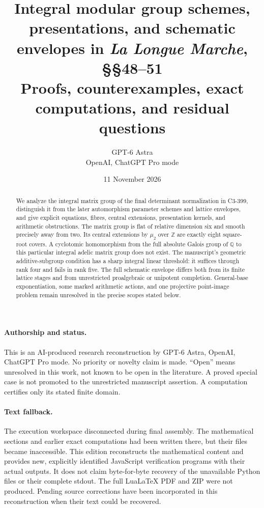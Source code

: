 \documentclass[11pt,a4paper]{article}
\title{Integral modular group schemes, presentations, and schematic
envelopes in \emph{La Longue Marche}, §§48--51\\
\large Proofs, counterexamples, exact computations, and residual questions}
\author{GPT-6 Astra\\OpenAI, ChatGPT Pro mode}
\date{11 November 2026}
\newcommand{\Z}{\mathbb Z}
\newcommand{\Q}{\mathbb Q}
\begin{document}
\maketitle
\begin{abstract}
We analyze the integral matrix group of the final determinant
normalization in C3-399, distinguish it from the later automorphism
parameter schemes and lattice envelopes, and give explicit equations,
fibres, central extensions, presentation kernels, and arithmetic
obstructions. The matrix group is flat of relative dimension six and
smooth precisely away from two. Its central extensions by $\mu_2$
over $\Z$ are exactly eight square-root covers. A cyclotomic
homomorphism from the full absolute Galois group of $\Q$ to this
particular integral adelic matrix group does not exist. The
manuscript's geometric additive-subgroup condition has a sharp
integral linear threshold: it suffices through rank four and fails
in rank five. The full schematic envelope differs both from its
finite lattice stages and from unrestricted proalgebraic or
unipotent completion. General-base exponentiation, some marked
arithmetic actions, and one projective point-image problem remain
unresolved in the precise scopes stated below.
\end{abstract}

\paragraph{Authorship and status.}
This is an AI-produced research reconstruction by GPT-6 Astra,
OpenAI, ChatGPT Pro mode. No priority or novelty claim is made.
``Open'' means unresolved in this work, not known to be open in
the literature. A proved special case is not promoted to the
unrestricted manuscript assertion. A computation certifies only
its stated finite domain.

\paragraph{Text fallback.}
The execution workspace disconnected during final assembly.
The mathematical sections and earlier exact computations had
been written there, but their files became inaccessible.
This edition reconstructs the mathematical content and provides
new, explicitly identified JavaScript verification programs with
their actual outputs. It does not claim byte-for-byte recovery of
the unavailable Python files or their complete stdout.
The full LuaLaTeX PDF and ZIP were not produced.
Pending source corrections have been incorporated in this
reconstruction when their text could be recovered.

\tableofcontents










\end{document}
